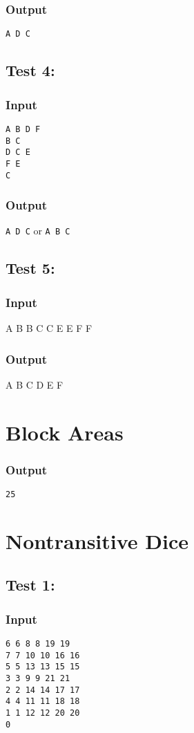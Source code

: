 \documentclass[twocolumn,9pt]{extarticle}
\begin{document}
\subsubsection*{Output}
\texttt{A D C}

\subsection*{Test 4:}
\subsubsection*{Input}
\texttt{A B D F\\
B C\\
D C E\\
F E\\
C}

\subsubsection*{Output}
\texttt{A D C}
or
\texttt{A B C}

\subsection*{Test 5:}
\subsubsection*{Input}
A B
B C
C E
E F
F

\subsubsection*{Output}
A B C D E F


\section{Block Areas}
\subsubsection*{Output}
\texttt{25}


\section{Nontransitive Dice}
\subsection*{Test 1:}
\subsubsection*{Input}
\texttt{6 6 8 8 19 19\\
7 7 10 10 16 16\\
5 5 13 13 15 15\\
3 3 9 9 21 21\\
2 2 14 14 17 17\\
4 4 11 11 18 18\\
1 1 12 12 20 20\\
0}
 
\end{document}
